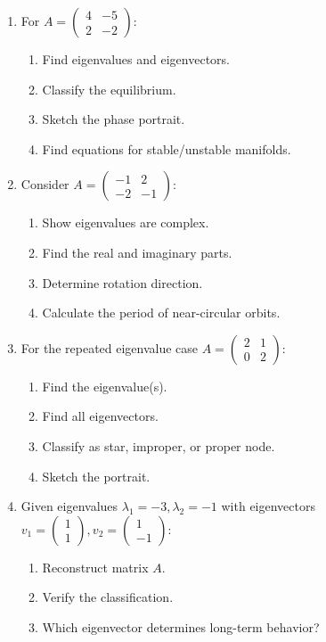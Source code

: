 \documentclass[12pt]{article}
\begin{document}
\begin{enumerate}[resume]
\item For $A = \begin{pmatrix} 4 & -5 \\ 2 & -2 \end{pmatrix}$:
\begin{enumerate}[label=(\alph*)]
    \item Find eigenvalues and eigenvectors.
    \item Classify the equilibrium.
    \item Sketch the phase portrait.
    \item Find equations for stable/unstable manifolds.
\end{enumerate}

\item Consider $A = \begin{pmatrix} -1 & 2 \\ -2 & -1 \end{pmatrix}$:
\begin{enumerate}[label=(\alph*)]
    \item Show eigenvalues are complex.
    \item Find the real and imaginary parts.
    \item Determine rotation direction.
    \item Calculate the period of near-circular orbits.
\end{enumerate}

\item For the repeated eigenvalue case $A = \begin{pmatrix} 2 & 1 \\ 0 & 2 \end{pmatrix}$:
\begin{enumerate}[label=(\alph*)]
    \item Find the eigenvalue(s).
    \item Find all eigenvectors.
    \item Classify as star, improper, or proper node.
    \item Sketch the portrait.
\end{enumerate}

\item Given eigenvalues $\lambda_{1} = -3, \lambda_{2} = -1$ with eigenvectors $v_{1} = \begin{pmatrix} 1 \\ 1 \end{pmatrix}, v_{2} = \begin{pmatrix} 1 \\ -1 \end{pmatrix}$:
\begin{enumerate}[label=(\alph*)]
    \item Reconstruct matrix $A$.
    \item Verify the classification.
    \item Which eigenvector determines long-term behavior?
\end{enumerate}


\end{enumerate}
\end{document}
